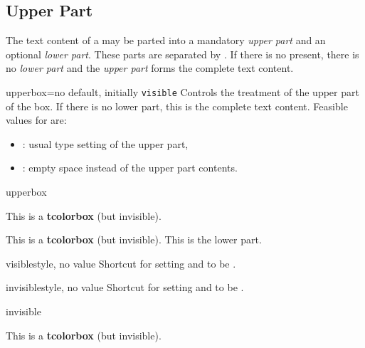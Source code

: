 \clearpage
\subsection{Upper Part}
The text content of a  may be parted into a mandatory \emph{upper part}
and an optional \emph{lower part}. These parts are separated by
. If there is no  present, there is no
\emph{lower part} and the \emph{upper part} forms the complete text content.

\begin{docTcbKey}[][doc new=2015-01-06]{upperbox}{=}{no default, initially \texttt{visible}}
  Controls the treatment of the upper part of the box. If there is no lower part,
  this is the complete text content.
  Feasible values for  are:
  \begin{itemize}
  \item{}: usual type setting of the upper part,
  \item{}: empty space instead of the upper part contents.
  \end{itemize}
\begin{exdispExample}{upperbox}
\begin{tcolorbox}[upperbox=invisible,colback=white]
This is a \textbf{tcolorbox} (but invisible).
\end{tcolorbox}

\bigskip

\begin{tcolorbox}[upperbox=invisible,colback=white]
This is a \textbf{tcolorbox} (but invisible).
\tcblower
This is the lower part.
\end{tcolorbox}
\end{exdispExample}
\end{docTcbKey}


\begin{docTcbKey}[][doc new=2015-01-06]{visible}{}{style, no value}
  Shortcut for setting  and 
  to be .
\end{docTcbKey}

\begin{docTcbKey}[][doc new=2015-01-06]{invisible}{}{style, no value}
  Shortcut for setting  and 
  to be .
\begin{exdispExample}{invisible}
\begin{tcolorbox}[invisible]
This is a \textbf{tcolorbox} (but invisible).
\end{tcolorbox}
\end{exdispExample}
\end{docTcbKey}


